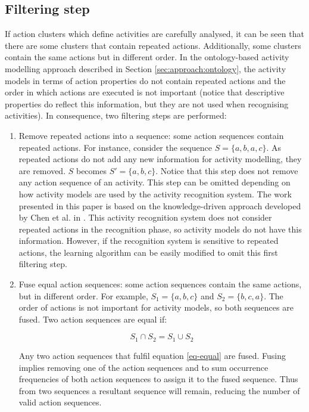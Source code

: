 \subsection{Filtering step}
\label{subsec:learner:filtering}

If action clusters which define activities are carefully analysed, it can be seen that there are some clusters that contain repeated actions. Additionally, some clusters contain the same actions but in different order. In the ontology-based activity modelling approach described in Section \ref{sec:approach:ontology}, the activity models in terms of action properties do not contain repeated actions and the order in which actions are executed is not important (notice that descriptive properties do reflect this information, but they are not used when recognising activities). In consequence, two filtering steps are performed:

\begin{enumerate}
 \item Remove repeated actions into a sequence: some action sequences contain repeated actions. For instance, consider the sequence $S=\{a, b, a, c\}$. As repeated actions do not add any new information for activity modelling, they are removed. $S$ becomes $S' = \{a, b, c\}$. Notice that this step does not remove any action sequence of an activity. This step can be omitted depending on how activity models are used by the activity recognition system. The work presented in this paper is based on the knowledge-driven approach developed by Chen et al. in \cite{Chen2012a}. This activity recognition system does not consider repeated actions in the recognition phase, so activity models do not have this information. However, if the recognition system is sensitive to repeated actions, the learning algorithm can be easily modified to omit this first filtering step.
 
 \item Fuse equal action sequences: some action sequences contain the same actions, but in different order. For example, $S_1 = \{a, b, c \}$ and $S_2 = \{b, c, a\}$. The order of actions is not important for activity models, so both sequences are fused. Two action sequences are equal if:
 
 \begin{equation}
 \label{eq-equal}
  S_1 \cap S_2 = S_1 \cup S_2
 \end{equation}

 Any two action sequences that fulfil equation \ref{eq-equal} are fused. Fusing implies removing one of the action sequences and to sum occurrence frequencies of both action sequences to assign it to the fused sequence. Thus from two sequences a resultant sequence will remain, reducing the number of valid action sequences.

\end{enumerate}

